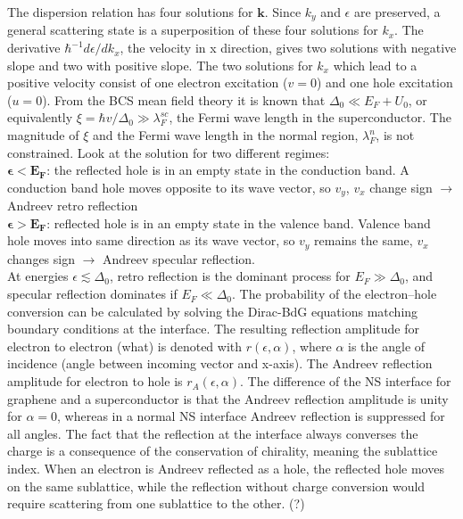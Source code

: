 The dispersion relation has four solutions for $\mathbf{k}$. Since $k_y$ and $\epsilon$ are preserved, a general scattering state is a superposition of these four solutions for $k_x$. The derivative $\hbar^{-1} d\epsilon / d k_x$, the velocity in x direction, gives two solutions with negative slope and two with positive slope. The two solutions for $k_x$ which lead to a positive velocity consist of one electron excitation ($v=0$) and one hole excitation ($u=0$). 
From the BCS mean field theory it is known that $\Delta_0 \ll E_F + U_0$, or equivalently $\xi = \hbar v /\Delta_0 \gg \lambda_F^{sc}$, the Fermi wave length in the superconductor. The magnitude of $\xi$ and the Fermi wave length in the normal region, $\lambda_F^{n}$, is not constrained.
Look at the solution for two different regimes:\\
$\mathbf{\epsilon < E_F}$:  the reflected hole is in an empty state in the conduction band. A conduction band hole moves opposite to its wave vector, so $v_y$, $v_x$ change sign $\rightarrow$ Andreev retro reflection \\
$\mathbf{\epsilon > E_F}$: reflected hole is in an empty state in the valence band. Valence band hole moves into same direction as its wave vector, so $v_y$ remains the same, $v_x$ changes sign $\rightarrow$ Andreev specular reflection. \\
At energies $\epsilon \lesssim \Delta_0$, retro reflection is the dominant process for $E_F \gg \Delta_0$, and specular reflection dominates if $E_F \ll \Delta_0$.
The probability of the electron--hole conversion can be calculated by solving the Dirac-BdG equations matching boundary conditions at the interface. The resulting reflection amplitude for electron to electron (what) is denoted with $r\left( \epsilon, \alpha\right)$, where $\alpha$ is the angle of incidence (angle between incoming vector and x-axis). The Andreev reflection amplitude for electron to hole is $r_A \left( \epsilon, \alpha \right)$. The difference of the NS interface for graphene and a superconductor is that the Andreev reflection amplitude is unity for $\alpha = 0$, whereas in a normal NS interface Andreev reflection is suppressed for all angles. 
The fact that the reflection at the interface always converses the charge is a consequence of the conservation of chirality, meaning the sublattice index. When an electron is Andreev reflected as a hole, the reflected hole moves on the same sublattice, while the reflection without charge conversion would require scattering from one sublattice to the other. (?)



 
